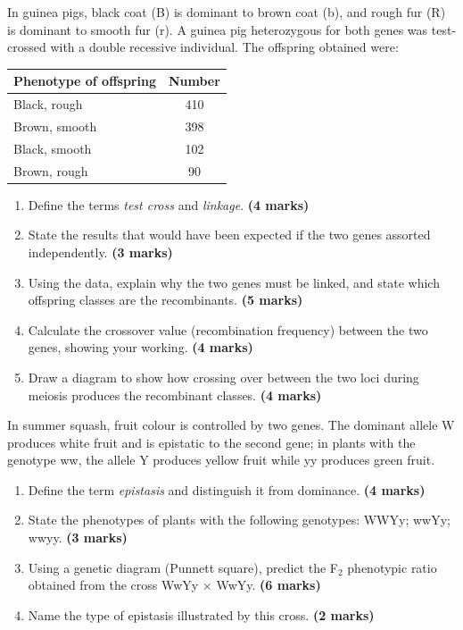 \documentclass[11pt]{article}
\newcounter{popsec}
\newcounter{popsub}
\newcommand{\courssub}[1]{%
  \stepcounter{popsub}%
  \par\vspace{9pt}\noindent{\popxbold\fontsize{11.5}{13}\selectfont\color{popink}{\color{poporange}\thepopsec.\thepopsub}\hspace{6pt}#1}\par\nopagebreak\vspace{4pt}
}
\begin{document}
\courssub{I prepare for the GCE}

\begin{exercice}
In guinea pigs, black coat (B) is dominant to brown coat (b), and rough fur (R) is dominant to smooth fur (r). A guinea pig heterozygous for both genes was test-crossed with a double recessive individual. The offspring obtained were:
\begin{center}
\begin{tabular}{|l|c|}
\hline
\rowcolor{popblueL} \textbf{Phenotype of offspring} & \textbf{Number} \\
\hline
Black, rough & 410 \\
\hline
Brown, smooth & 398 \\
\hline
Black, smooth & 102 \\
\hline
Brown, rough & 90 \\
\hline
\end{tabular}
\end{center}
\begin{enumerate}
\item Define the terms \emph{test cross} and \emph{linkage}. \textbf{(4 marks)}
\item State the results that would have been expected if the two genes assorted independently. \textbf{(3 marks)}
\item Using the data, explain why the two genes must be linked, and state which offspring classes are the recombinants. \textbf{(5 marks)}
\item Calculate the crossover value (recombination frequency) between the two genes, showing your working. \textbf{(4 marks)}
\item Draw a diagram to show how crossing over between the two loci during meiosis produces the recombinant classes. \textbf{(4 marks)}
\end{enumerate}
\end{exercice}

\begin{exercice}
In summer squash, fruit colour is controlled by two genes. The dominant allele W produces white fruit and is epistatic to the second gene; in plants with the genotype ww, the allele Y produces yellow fruit while yy produces green fruit.
\begin{enumerate}
\item Define the term \emph{epistasis} and distinguish it from dominance. \textbf{(4 marks)}
\item State the phenotypes of plants with the following genotypes: WWYy; wwYy; wwyy. \textbf{(3 marks)}
\item Using a genetic diagram (Punnett square), predict the F$_2$ phenotypic ratio obtained from the cross WwYy $\times$ WwYy. \textbf{(6 marks)}
\item Name the type of epistasis illustrated by this cross. \textbf{(2 marks)}
\end{enumerate}
\end{exercice}
\end{document}
